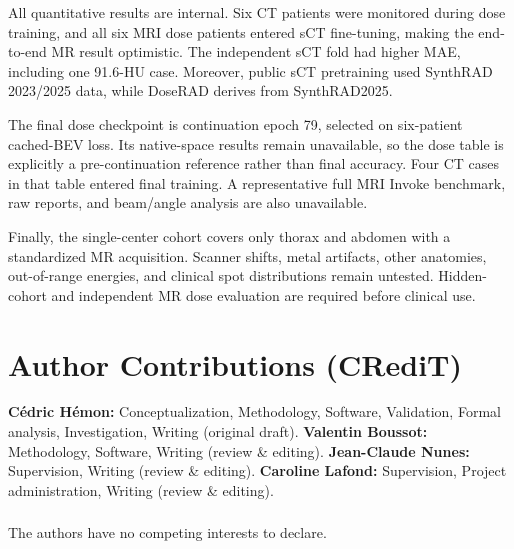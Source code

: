 \documentclass[runningheads]{llncs}
\begin{document}
All quantitative results are internal. Six CT patients were monitored during
dose training, and all six MRI dose patients entered sCT fine-tuning, making
the end-to-end MR result optimistic. The independent sCT fold had higher MAE,
including one 91.6-HU case. Moreover, public sCT pretraining used SynthRAD
2023/2025 data, while DoseRAD derives from SynthRAD2025.

The final dose checkpoint is continuation epoch 79, selected on six-patient
cached-BEV loss. Its native-space results remain unavailable, so the dose table
is explicitly a pre-continuation reference rather than final accuracy. Four CT
cases in that table entered final training. A representative full MRI Invoke
benchmark, raw reports, and beam/angle analysis are also unavailable.

Finally, the single-center cohort covers only thorax and abdomen with a
standardized MR acquisition. Scanner shifts, metal artifacts, other anatomies,
out-of-range energies, and clinical spot distributions remain untested. Hidden-
cohort and independent MR dose evaluation are required before clinical use.

\section*{Author Contributions (CRediT)}

\textbf{C\'edric H\'emon:} Conceptualization, Methodology, Software,
Validation, Formal analysis, Investigation, Writing (original draft).
\textbf{Valentin Boussot:} Methodology, Software, Writing (review \& editing).
\textbf{Jean-Claude Nunes:} Supervision, Writing (review \& editing).
\textbf{Caroline Lafond:} Supervision, Project administration, Writing (review \& editing).

\begin{credits}
\subsubsection{\discintname}
The authors have no competing interests to declare.
\end{credits}



\end{document}
